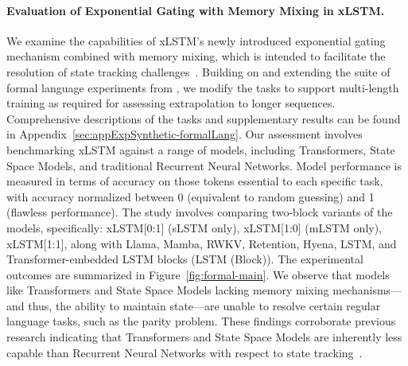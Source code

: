 \paragraph{Evaluation of Exponential Gating with Memory Mixing in xLSTM.} We examine the capabilities of xLSTM's newly introduced exponential gating mechanism combined with memory mixing, which is intended to facilitate the resolution of state tracking challenges~\citep{Merrill:24, Merrill:23}. Building on and extending the suite of formal language experiments from \citet{Deletang:23}, we modify the tasks to support multi-length training as required for assessing extrapolation to longer sequences. Comprehensive descriptions of the tasks and supplementary results can be found in Appendix~\ref{sec:appExpSynthetic-formalLang}. Our assessment involves benchmarking xLSTM against a range of models, including Transformers, State Space Models, and traditional Recurrent Neural Networks. Model performance is measured in terms of accuracy on those tokens essential to each specific task, with accuracy normalized between 0 (equivalent to random guessing) and 1 (flawless performance). The study involves comparing two-block variants of the models, specifically: xLSTM[0:1] (sLSTM only), xLSTM[1:0] (mLSTM only), xLSTM[1:1], along with Llama, Mamba, RWKV, Retention, Hyena, LSTM, and Transformer-embedded LSTM blocks (LSTM (Block)). The experimental outcomes are summarized in Figure~\ref{fig:formal-main}. We observe that models like Transformers and State Space Models lacking memory mixing mechanisms—and thus, the ability to maintain state—are unable to resolve certain regular language tasks, such as the parity problem. These findings corroborate previous research indicating that Transformers and State Space Models are inherently less capable than Recurrent Neural Networks with respect to state tracking~\citep{Merrill:24, Merrill:23, Deletang:23}.

